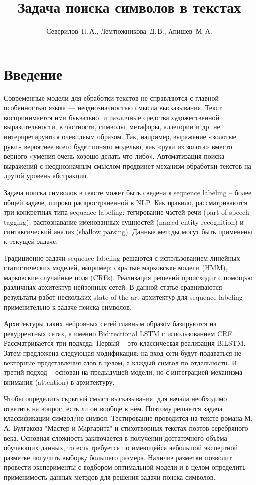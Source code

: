 \documentclass[12pt,twoside]{article}
\title
    [Задача поиска символов в текстах] %
    {Задача поиска символов в текстах}
\author
    [Северилов~П.\,А.] %
    {Северилов~П.\,А., Лемтюжникова~Д.\,В., Апишев~М.\,А.} %
    [Северилов~П.\,А.$^1$, Лемтюжникова~Д.\,В.$^1$, Апишев~М.\,А.$^2$] %
\begin{document}
\maketitle
\section{Введение}
Современные модели для обработки текстов не справляются с главной особенностью языка — неоднозначностью смысла высказывания. Текст воспринимается ими буквально, и различные средства художественной выразительности, в частности, символы, метафоры, аллегории и др. не интерпретируются очевидным образом. Так, например, выражение «золотые руки» вероятнее всего будет понято моделью, как «руки из золота» вместо верного «умения очень хорошо делать что-либо». Автоматизация поиска выражений с неоднозначным смыслом продвинет механизм обработки текстов на другой уровень абстракции.

Задача поиска символов в тексте может быть сведена к sequence labeling -- более общей задаче, широко распространенной в NLP. Как правило, рассматриваются три конкретных типа sequence labeling: тегирование частей речи (part-of-speech tagging), распознавание именованных сущностей (named entity recognition) и синтаксический анализ (shallow parsing). Данные методы могут быть применены к текущей задаче.

Традиционно задачи sequence labeling решаются с использованием линейных статистических моделей, например: скрытые марковские модели (HMM), марковские случайные поля (CRFs). Реализация решений происходит с помощью различных архитектур нейронных сетей. В данной статье сравниваются результаты работ нескольких state-of-the-art архитектур для sequence labeling применительно к задаче поиска символов. 

Архитектуры таких нейронных сетей главным образом базируются на рекуррентных сетях, а именно Bidirectional LSTM с использованием CRF. Рассматривается три подхода. Первый -- это классическая реализация BiLSTM. Затем предложена следующая модификация: на вход сети будут подаваться не векторные представления слов в целом, а каждый символ по отдельности. И третий подход -- основан на предыдущей модели, но с интеграцией механизма внимания (attention) в архитектуру. %

Чтобы определить скрытый смысл высказывания, для начала необходимо ответить на вопрос, есть ли он вообще в нём. Поэтому решается задача классификации символ/не символ. Тестирование проводится на тексте романа М. А. Булгакова "Мастер и Маргарита" и стихотворных текстах поэтов серебряного века. Основная сложность заключается в получении достаточного объёма обучающих данных, то есть требуется по имеющейся небольшой экспертной разметке получить выборку большего размера. Наличие разметки позволит провести эксперименты с подбором оптимальной модели и в целом определить применимость данных методов для решения задачи поиска символов.
\end{document}
